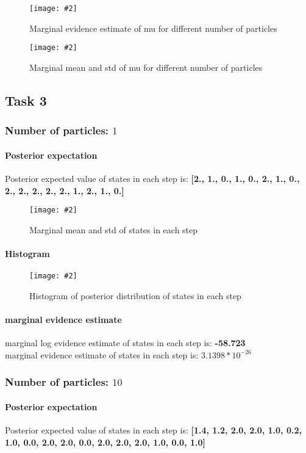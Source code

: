 \documentclass{article}
\newcommand{\centerfigcap}[3]{\begin{figure}[H]
\begin{center}\texttt{[image: \#2]} \caption{#3}\end{center}
\end{figure}}
\begin{document}
\begin{minipage}{.5\textwidth}
  \centering
\centerfigcap{1}{../Figures/Evidence_2}{Marginal evidence estimate of mu for different number of particles}
\end{minipage}%
\begin{minipage}{.5\textwidth}
  \centering
\centerfigcap{1}{../Figures/Mean-Std_2}{Marginal mean and std of mu for different number of particles}
\end{minipage}


\subsection{Task 3}
\subsubsection{Number of particles: $1$}
\paragraph{Posterior expectation}
Posterior expected value of states in each step is: \textbf{[2., 1., 0., 1., 0., 2., 1., 0., 2., 2., 2., 2., 2., 1., 2., 1., 0.]}\\

\centerfigcap{0.6}{../Figures/Mean-Std_3_0}{Marginal mean and std of states in each step}

\paragraph{Histogram}
\centerfigcap{0.7}{../Figures/Histogram_3_0}{Histogram of posterior distribution of states in each step}
\paragraph{marginal evidence estimate}
marginal log evidence estimate of states in each step is: \textbf{-58.723}\\
marginal evidence estimate of states in each step is: \textbf{$3.1398*10^{-26}$}
\pagebreak

\subsubsection{Number of particles: $10$}
\paragraph{Posterior expectation}
Posterior expected value of states in each step is: \textbf{[1.4, 1.2, 2.0, 2.0, 1.0, 0.2, 1.0, 0.0, 2.0,
2.0, 0.0, 2.0, 2.0, 2.0, 1.0, 0.0, 1.0]}\\
\end{document}
